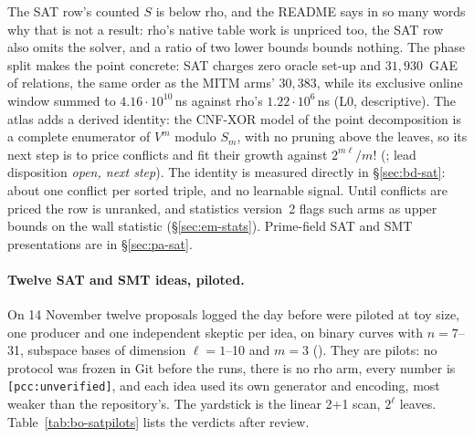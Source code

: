 The SAT row's counted $S$ is below rho, and the README says in so many
words why that is not a result: rho's native table work is unpriced too,
the SAT row also omits the solver, and a ratio of two lower bounds bounds
nothing. The phase split makes the point concrete: SAT charges zero oracle
set-up and $31{,}930$~GAE of relations, the same order as the MITM arms'
$30{,}383$, while its exclusive online window summed to $4.16\cdot10^{10}$\,ns
against rho's $1.22\cdot10^6$\,ns (L0, descriptive). The atlas adds a derived
identity: the CNF-XOR model of the point decomposition is a complete
enumerator of $V^m$ modulo $S_m$, with no pruning above the leaves, so its
next step is to price conflicts and fit their growth against $2^{m\ell}/m!$
(;
lead disposition \emph{open, next step}). The identity is measured directly
in \S\ref{sec:bd-sat}: about one conflict per sorted triple, and no
learnable signal. Until conflicts are priced the
row is unranked, and statistics version~2 flags such arms as upper bounds on
the wall statistic (\S\ref{sec:em-stats}). Prime-field SAT and SMT
presentations are in \S\ref{sec:pa-sat}.

\paragraph{Twelve SAT and SMT ideas, piloted.} On 14 November twelve
proposals logged the day before were piloted at toy size, one producer and
one independent skeptic per idea, on binary curves with $n=7$--31, subspace
bases of dimension $\ell=1$--10 and $m=3$ ().
They are pilots: no protocol was frozen in Git before the runs, there is
no rho arm, every number is \texttt{[pcc:unverified]}, and each idea used
its own generator and encoding, most weaker than the repository's. The
yardstick is the linear 2+1 scan, $2^\ell$ leaves.
Table~\ref{tab:bo-satpilots} lists the verdicts after review.


